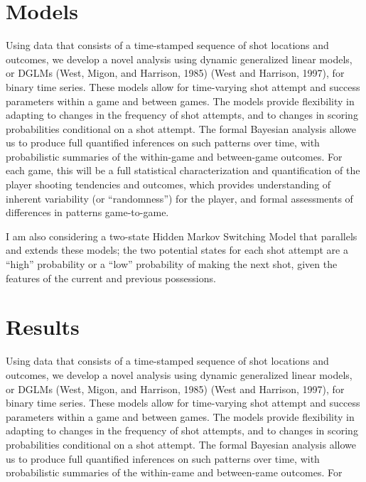 \documentclass[12pt,twoside]{dukestatscithesis}
\theoremstyle{definition}
\theoremstyle{definition}
\theoremstyle{definition}
\theoremstyle{remark}
\begin{document}
\chapter{Models}\label{model}

Using data that consists of a time-stamped sequence of shot locations
and outcomes, we develop a novel analysis using dynamic generalized
linear models, or DGLMs (West, Migon, and Harrison, 1985) (West and
Harrison, 1997), for binary time series. These models allow for
time-varying shot attempt and success parameters within a game and
between games. The models provide flexibility in adapting to changes in
the frequency of shot attempts, and to changes in scoring probabilities
conditional on a shot attempt. The formal Bayesian analysis allowe us to
produce full quantified inferences on such patterns over time, with
probabilistic summaries of the within-game and between-game outcomes.
For each game, this will be a full statistical characterization and
quantification of the player shooting tendencies and outcomes, which
provides understanding of inherent variability (or ``randomness'') for
the player, and formal assessments of differences in patterns
game-to-game.

I am also considering a two-state Hidden Markov Switching Model that
parallels and extends these models; the two potential states for each
shot attempt are a ``high'' probability or a ``low'' probability of
making the next shot, given the features of the current and previous
possessions.

\chapter{Results}\label{results}

Using data that consists of a time-stamped sequence of shot locations
and outcomes, we develop a novel analysis using dynamic generalized
linear models, or DGLMs (West, Migon, and Harrison, 1985) (West and
Harrison, 1997), for binary time series. These models allow for
time-varying shot attempt and success parameters within a game and
between games. The models provide flexibility in adapting to changes in
the frequency of shot attempts, and to changes in scoring probabilities
conditional on a shot attempt. The formal Bayesian analysis allowe us to
produce full quantified inferences on such patterns over time, with
probabilistic summaries of the within-game and between-game outcomes.
For each game, this will be a full statistical characterization and
quantification of the player shooting tendencies and outcomes, which
provides understanding of inherent variability (or ``randomness'') for
the player, and formal assessments of differences in patterns
game-to-game.
\end{document}
